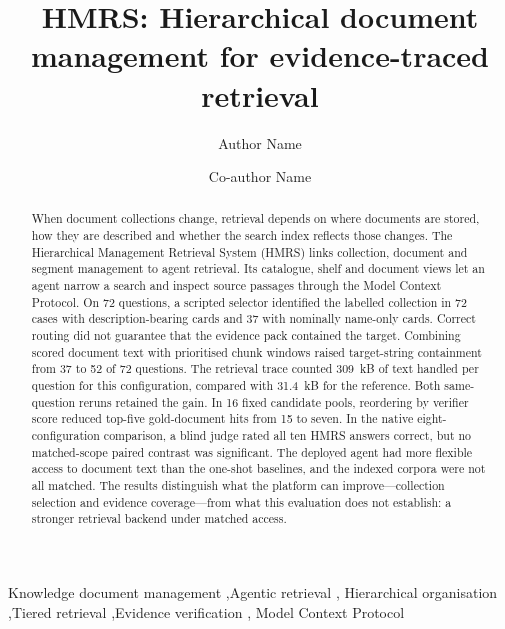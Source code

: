 \documentclass[review,12pt]{elsarticle}
\begin{document}
\begin{frontmatter}

\title{HMRS: Hierarchical document management for evidence-traced retrieval}

\author[inst1]{Author Name}
\author[inst1]{Co-author Name}

\begin{abstract}
When document collections change, retrieval depends on where documents are
stored, how they are described and whether the search index reflects those
changes. The Hierarchical Management Retrieval System (HMRS) links
collection, document and segment management to agent retrieval. Its
catalogue, shelf and document views let an agent narrow a search and
inspect source passages through the Model Context Protocol. On 72
questions, a scripted selector identified the labelled collection in
72 cases with description-bearing cards and 37 with nominally name-only
cards. Correct routing did not guarantee that the evidence pack contained
the target. Combining scored document text with prioritised chunk windows
raised target-string containment from 37 to 52 of 72 questions. The
retrieval trace counted 309~kB of text handled per question for this
configuration, compared with 31.4~kB for the reference.
Both same-question reruns retained the gain. In 16 fixed candidate pools,
reordering by verifier score reduced top-five gold-document hits from 15
to seven. In the native eight-configuration comparison, a blind judge
rated all ten HMRS answers correct, but no matched-scope paired contrast
was significant. The deployed agent had more flexible access to document
text than the one-shot baselines, and the indexed corpora were not all
matched. The results distinguish
what the platform can improve---collection selection and evidence
coverage---from what this evaluation does not establish: a stronger
retrieval backend under matched access.
\end{abstract}

\begin{keyword}
Knowledge document management \sep Agentic retrieval \sep
Hierarchical organisation \sep Tiered retrieval \sep Evidence verification \sep
Model Context Protocol
\end{keyword}

\end{frontmatter}












\FloatBarrier





{\ifdefined\HMRSReviewLayout\else\footnotesize\fi
\renewcommand{\baselinestretch}{0.90}\selectfont
\setlength{\bibsep}{-0.3pt plus 0.05ex}


}
\end{document}
